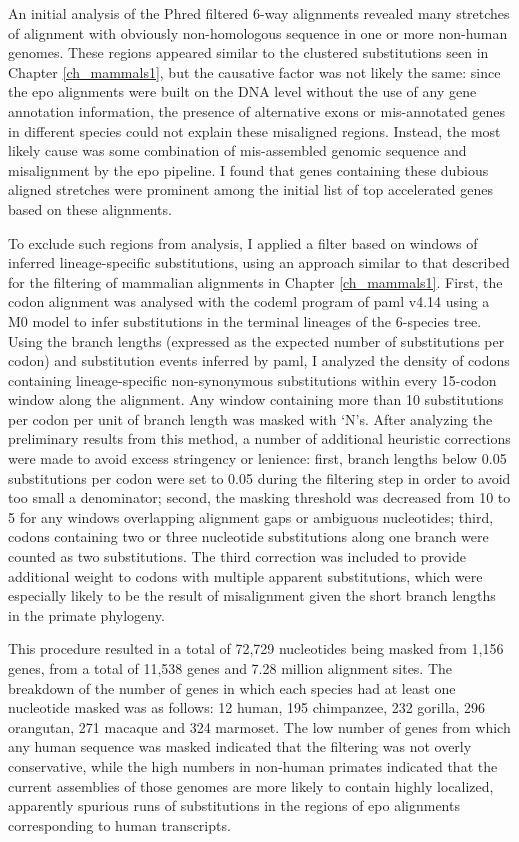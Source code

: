 An initial analysis of the Phred filtered 6-way alignments revealed
many stretches of alignment with obviously non-homologous sequence in
one or more non-human genomes. These regions appeared similar to the
clustered substitutions seen in Chapter \ref{ch_mammals1}, but the
causative factor was not likely the same: since the \ac{epo}
alignments were built on the DNA level without the use of any gene
annotation information, the presence of alternative exons or
mis-annotated genes in different species could not explain these
misaligned regions. Instead, the most likely cause was some
combination of mis-assembled genomic sequence and misalignment by the
\ac{epo} pipeline. I found that genes containing these dubious aligned
stretches were prominent among the initial list of top accelerated
genes based on these alignments.

To exclude such regions from analysis, I applied a filter based on
windows of inferred lineage-specific substitutions, using an approach
similar to that described for the filtering of mammalian alignments in
Chapter \ref{ch_mammals1}. First, the codon alignment was analysed
with the codeml program of \ac{paml} v4.14 using a M0 model to infer
substitutions in the terminal lineages of the 6-species tree. Using
the branch lengths (expressed as the expected number of substitutions
per codon) and substitution events inferred by \ac{paml}, I analyzed
the density of codons containing lineage-specific non-synonymous
substitutions within every 15-codon window along the alignment. Any
window containing more than 10 \nsyn substitutions per codon per unit
of branch length was masked with `N's. After analyzing the preliminary
results from this method, a number of additional heuristic corrections
were made to avoid excess stringency or lenience: first, branch
lengths below 0.05 substitutions per codon were set to 0.05 during the
filtering step in order to avoid too small a denominator; second, the
masking threshold was decreased from 10 to 5 for any windows
overlapping alignment gaps or ambiguous nucleotides; third, codons
containing two or three nucleotide substitutions along one branch were
counted as two \nsyn substitutions. The third correction was included
to provide additional weight to codons with multiple apparent
substitutions, which were especially likely to be the result of
misalignment given the short branch lengths in the primate phylogeny.

This procedure resulted in a total of 72,729 nucleotides being masked
from 1,156 genes, from a total of 11,538 genes and 7.28 million
alignment sites. The breakdown of the number of genes in which each
species had at least one nucleotide masked was as follows: 12 human,
195 chimpanzee, 232 gorilla, 296 orangutan, 271 macaque and 324
marmoset.  The low number of genes from which any human sequence was
masked indicated that the filtering was not overly conservative, while
the high numbers in non-human primates indicated that the current
assemblies of those genomes are more likely to contain highly
localized, apparently spurious runs of \nsyn substitutions in the
regions of \ac{epo} alignments corresponding to human transcripts.

